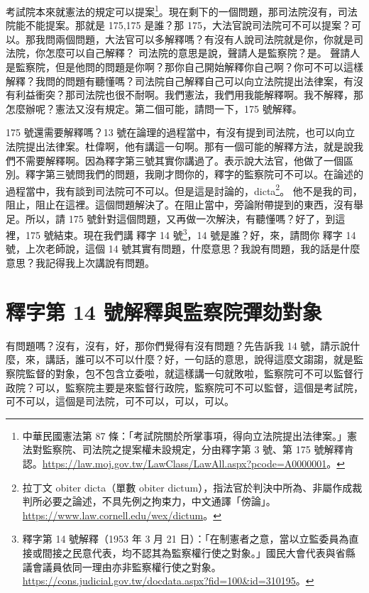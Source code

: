 \hypertarget{c08:cue:126}{}考試院本來就憲法的規定可以提案\footnote{中華民國憲法第 87 條：「考試院關於所掌事項，得向立法院提出法律案。」憲法對監察院、司法院之提案權未設規定，分由釋字第 3 號、第 175 號解釋肯認。\url{https://law.moj.gov.tw/LawClass/LawAll.aspx?pcode=A0000001}。}。現在剩下的一個問題，那司法院沒有，司法院能不能提案。那就是 175,175 是誰？那 175，大法官說司法院可不可以提案？可以。那我問兩個問題，大法官可以多解釋嗎？有沒有人說司法院就是你，你就是司法院，你怎麼可以自己解釋？
\hypertarget{c08:cue:127}{}司法院的意思是說，聲請人是監察院？是。 聲請人是監察院，但是他問的問題是你啊？那你自己開始解釋你自己啊？你可不可以這樣解釋？我問的問題有聽懂嗎？司法院自己解釋自己可以向立法院提出法律案，有沒有利益衝突？那司法院也很不耐啊。我們憲法，我們用我能解釋啊。我不解釋，那怎麼辦呢？憲法又沒有規定。第二個可能，請問一下，175 號解釋。

\hypertarget{c08:cue:128}{}175 號還需要解釋嗎？13 號在論理的過程當中，有沒有提到司法院，也可以向立法院提出法律案。杜偉啊，他有講這一句啊。那有一個可能的解釋方法，就是說我們不需要解釋啊。因為釋字第三號其實你講過了。表示說大法官，他做了一個區別。釋字第三號問我們的問題，我剛才問你的，釋字的監察院可不可以。在論述的過程當中，我有談到司法院可不可以。但是這是討論的，dicta\footnote{拉丁文 obiter dicta（單數 obiter dictum），指法官於判決中所為、非屬作成裁判所必要之論述，不具先例之拘束力，中文通譯「傍論」。\url{https://www.law.cornell.edu/wex/dictum}。}。
\hypertarget{c08:cue:129}{}他不是我的司，阻止，阻止在這裡。這個問題解決了。在阻止當中，旁論附帶提到的東西，沒有舉足。所以，請 175 號針對這個問題，又再做一次解決，有聽懂嗎？好了，到這裡，175 號結束。現在我們講 釋字 14 號\footnote{釋字第 14 號解釋（1953 年 3 月 21 日）：「在制憲者之意，當以立監委員為直接或間接之民意代表，均不認其為監察權行使之對象。」國民大會代表與省縣議會議員依同一理由亦非監察權行使之對象。\url{https://cons.judicial.gov.tw/docdata.aspx?fid=100&id=310195}。}，14 號是誰？好，來，請問你 釋字 14 號，上次老師說，這個 14 號其實有問題，什麼意思？我說有問題，我的話是什麼意思？我記得我上次講說有問題。

\section{釋字第 14 號解釋與監察院彈劾對象}

\hypertarget{c08:cue:130}{}有問題嗎？沒有，沒有，好，那你們覺得有沒有問題？先告訴我 14 號，請示說什麼，來，講話，誰可以不可以什麼？好，一句話的意思，說得這麼文謅謅，就是監察院監督的對象，包不包含立委啦，就這樣講一句就敗啦，監察院可不可以監督行政院？可以，監察院主要是來監督行政院，監察院可不可以監督，這個是考試院，可不可以，這個是司法院，可不可以，可以，可以。

